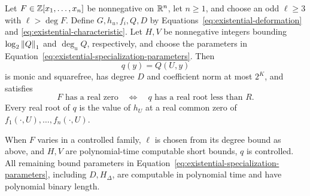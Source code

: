 \begin{proposition}\label{prop:specialization}
Let $F\in\mathbb Z[x_1,\ldots,x_n]$ be nonnegative on $\mathbb R^n$, let
$n\ge1$, and choose an odd $\ell\ge3$ with $\ell>\deg F$.
Define $G,h_u,f_i,Q,D$ by
Equations~\eqref{eq:existential-deformation} and
\eqref{eq:existential-characteristic}.  Let $H,V$ be nonnegative integers bounding
$\log_2\left\lVert Q\right\rVert_1$ and $\deg_uQ$, respectively, and choose the parameters
in Equation~\eqref{eq:existential-specialization-parameters}.  Then
\[
 q(y)=Q(U,y)
\]
is monic and squarefree, has degree $D$ and coefficient norm at most
$2^K$, and satisfies
\begin{equation}\label{eq:existential-root-equivalence}
 F\text{ has a real zero}
 \quad\Longleftrightarrow\quad
 q\text{ has a real root less than }R.
\end{equation}
Every real root of $q$ is the value of $h_U$ at a real common zero of
$f_1(\cdot,U),\ldots,f_n(\cdot,U)$.

When $F$ varies in a controlled family, $\ell$ is chosen from its
degree bound as above, and $H,V$ are polynomial-time computable short
bounds, $q$ is controlled.  All remaining bound parameters in
Equation~\eqref{eq:existential-specialization-parameters}, including
$D,H_\Delta$, are computable in polynomial time and have polynomial
binary length.
\end{proposition}

